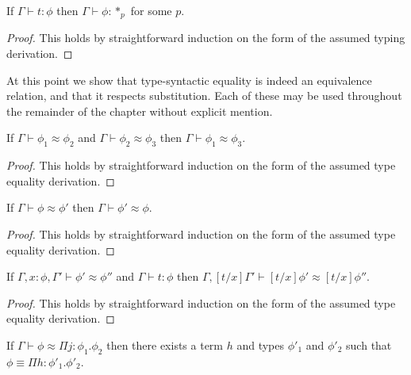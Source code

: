 \begin{lemma}[Regularity]
  If $\Gamma \vdash t:\phi$ then $\Gamma \vdash \phi:*_p$ for some $p$.
  \label{lemma:regularity_ssfe}
\end{lemma}
\begin{proof}
  This holds by straightforward induction on the form of the assumed
  typing derivation.
\end{proof}
\noindent
At this point we show that type-syntactic equality is indeed an
equivalence relation, and that it respects substitution.  Each of
these may be used throughout the remainder of the chapter without
explicit mention.
\begin{lemma}
  \label{lemma:transitivity_of_type_equality_ssfe}
  If $\Gamma \vdash \phi_1 \approx \phi_2$ and $\Gamma \vdash \phi_2 \approx \phi_3$ then
  $\Gamma \vdash \phi_1 \approx \phi_3$.
\end{lemma}
\begin{proof}
  This holds by straightforward induction on the form of the assumed
  type equality derivation.
\end{proof}
\begin{lemma}
  \label{lemma:symmetry_of_type_equality}
  If $\Gamma \vdash \phi \approx \phi'$ then $\Gamma \vdash \phi' \approx \phi$.
\end{lemma}
\begin{proof}
  This holds by straightforward induction on the form of the assumed
  type equality derivation.
\end{proof}
\begin{lemma}
  \label{lemma:substitution_for_type_equality_ssfe}
  If $\Gamma,x:\phi,\Gamma' \vdash \phi' \approx \phi''$ and $\Gamma \vdash t:\phi$ then
  $\Gamma,[t/x]\Gamma' \vdash [t/x]\phi' \approx [t/x]\phi''$.
\end{lemma}
\begin{proof}
  This holds by straightforward induction on the form of the assumed
  type equality derivation.
\end{proof}
\begin{lemma}[]
  \label{lemma:pis_are_equal_to_pis_ssfe}
  If $\Gamma \vdash \phi \approx \Pi j:\phi_1.\phi_2$ then there exists a term $h$ and types $\phi'_1$ and $\phi'_2$
  such that $\phi \equiv \Pi h:\phi'_1.\phi'_2$.
\end{lemma}
